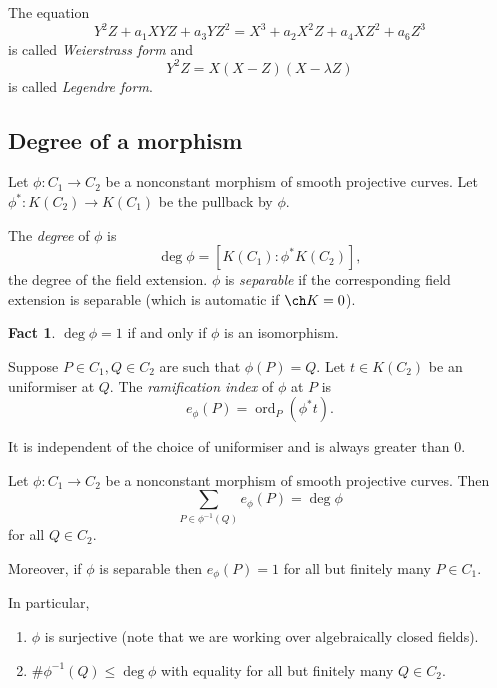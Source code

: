 \documentclass[a4paper]{article}
\theoremstyle{definition}
\newtheorem*{fact}{Fact}
\theoremstyle{theorem}
\DeclareMathOperator{\ord}{ord}
\begin{document}
The equation
\[
  Y^2Z + a_1 XYZ + a_3 YZ^2 = X^3 + a_2 X^2Z + a_4 XZ^2 + a_6 Z^3
\]
is called \emph{Weierstrass form} and
\[
  Y^2Z = X(X - Z)(X - \lambda Z)
\]
is called \emph{Legendre form}.

\subsection{Degree of a morphism}

Let \(\phi: C_1 \to C_2\) be a nonconstant morphism of smooth projective curves. Let \(\phi^*: K(C_2) \to K(C_1)\) be the pullback by \(\phi\).

\begin{definition}
  The \emph{degree} of \(\phi\) is
  \[
    \deg \phi = [K(C_1): \phi^*K(C_2)],
  \]
  the degree of the field extension. \(\phi\) is \emph{separable} if the corresponding field extension is separable (which is automatic if \(\ch K = 0\)).
\end{definition}

\begin{fact}
  \(\deg \phi = 1\) if and only if \(\phi\) is an isomorphism.
\end{fact}

\begin{definition}
  Suppose \(P \in C_1, Q \in C_2\) are such that \(\phi(P) = Q\). Let \(t \in K(C_2)\) be an uniformiser at \(Q\). The \emph{ramification index} of \(\phi\) at \(P\) is
  \[
    e_\phi(P) = \ord_P(\phi^*t).
  \]
\end{definition}

It is independent of the choice of uniformiser and is always greater than \(0\).
 
\begin{theorem}
  Let \(\phi: C_1 \to C_2\) be a nonconstant morphism of smooth projective curves. Then
  \[
    \sum_{P \in \phi^{-1}(Q)} e_\phi(P) = \deg \phi
  \]
  for all \(Q \in C_2\).

  Moreover, if \(\phi\) is separable then \(e_\phi(P) = 1\) for all but finitely many \(P \in C_1\).
\end{theorem}

In particular,
\begin{enumerate}
\item \(\phi\) is surjective (note that we are working over algebraically closed fields).
\item \(\# \phi^{-1}(Q) \leq \deg \phi\) with equality for all but finitely many \(Q \in C_2\).
\end{enumerate}
\end{document}
